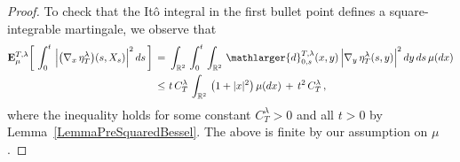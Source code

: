 \documentclass[10pt]{article}
\numberwithin{equation}{section}
\theoremstyle{definition}
\newcommand{\R}{{\mathbb R}}
\begin{document}
\begin{proof} To check that the It\^o integral in the first bullet point defines a square-integrable martingale, we observe that 
\begin{align*}
\mathbf{E}_{\mu}^{T,\lambda}\bigg[\, \int_0^t\, \Big|\big(\nabla_x\,\eta_{T}^{\lambda}\big)(s, X_{s})\Big|^2\,ds \,   \bigg]\,=\,&\, \int_{\R^2}\, \int_0^t \,\int_{\R^2 } \,  \mathlarger{d}_{0,s}^{T,\lambda}(x,y)\,\Big|  \nabla_y\, \eta_{T}^{\lambda}(s,y)\Big|^2\,dy\,ds\,\mu(dx) \nonumber \\ \,\leq \,&\,t\,C_T^{\lambda}\, \int_{\R^2}\,\big( 1+|x|^2  \big) \,\mu(dx) \,+\,t^2\,C_T^{\lambda} \,,
 \end{align*}
where the inequality holds for some constant $C_T^{\lambda}>0$ and all $t>0$ by Lemma~\ref{LemmaPreSquaredBessel}.  The above is finite by our assumption on $\mu$.


\end{proof}
\end{document}
